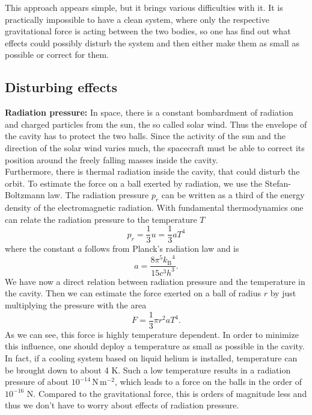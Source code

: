\documentclass[prb,preprint]{revtex4-1}
\begin{document}
This approach appears simple, but it brings various difficulties with it. It is practically impossible to have a clean system, where only the respective gravitational force is acting between the two bodies, so one has find out what effects could possibly disturb the system and then either make them as small as possible or correct for them. \\

\subsection{Disturbing effects}

\textbf{Radiation pressure:} In space, there is a constant bombardment of radiation and charged particles from the sun, the so called solar wind. Thus the envelope of the cavity has to protect the two balls. Since the activity of the sun and the direction of the solar wind varies much, the spacecraft must be able to correct its position around the freely falling masses inside the cavity.\\
Furthermore, there is thermal radiation inside the cavity, that could disturb the orbit. To estimate the force on a ball exerted by radiation, we use the Stefan-Boltzmann law. The radiation pressure $p_r$ can be written as a third of the energy density of the electromagnetic radiation. With fundamental thermodynamics one can relate the radiation pressure to the temperature $T$
\begin{equation}
\label{Stefan-Boltzmann}
p_r = \frac{1}{3} u = \frac{1}{3} a T^4
\end{equation}
where the constant $a$ follows from Planck's radiation law and is
\begin{equation}
\label{eq:a}
a = \frac{8 \pi^5 {k_\mathrm{B}}^4}{15 c^3 h^3}.
\end{equation}
We have now a direct relation between radiation pressure and the temperature in the cavity. Then we can estimate the force exerted on a ball of radius $r$ by just multiplying the pressure with the area
\begin{equation}
F = \frac{1}{3} \pi r^2 a T^4.
\end{equation}
As we can see, this force is highly temperature dependent. In order to minimize this influence, one should deploy a temperature as small as possible in the cavity. In fact, if a cooling system based on liquid helium is installed, temperature can be brought down to about 4 K. Such a low temperature results in a radiation pressure of about $10^{-14} \, \mathrm{N} \, \mathrm{m}^{-2}$, which leads to a force on the balls in the order of $10^{-16}$ N. Compared to the gravitational force, this is orders of magnitude less and thus we don't have to worry about effects of radiation pressure.\\
\end{document}
